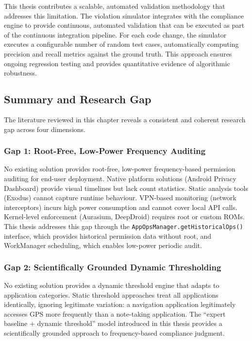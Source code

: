 This thesis contributes a scalable, automated validation methodology that addresses this limitation. The violation simulator integrates with the compliance engine to provide continuous, automated validation that can be executed as part of the continuous integration pipeline. For each code change, the simulator executes a configurable number of random test cases, automatically computing precision and recall metrics against the ground truth. This approach ensures ongoing regression testing and provides quantitative evidence of algorithmic robustness.

\subsection{Summary and Research Gap}
The literature reviewed in this chapter reveals a consistent and coherent research gap across four dimensions.

\subsubsection{Gap 1: Root-Free, Low-Power Frequency Auditing}
No existing solution provides root-free, low-power frequency-based permission auditing for end-user deployment. Native platform solutions (Android Privacy Dashboard) provide visual timelines but lack count statistics. Static analysis tools (Exodus) cannot capture runtime behaviour. VPN-based monitoring (network interceptors) incurs high power consumption and cannot cover local API calls. Kernel-level enforcement (Aurasium, DeepDroid) requires root or custom ROMs. This thesis addresses this gap through the \texttt{AppOpsManager.getHistoricalOps()} interface, which provides historical permission data without root, and WorkManager scheduling, which enables low-power periodic audit.

\subsubsection{Gap 2: Scientifically Grounded Dynamic Thresholding}
No existing solution provides a dynamic threshold engine that adapts to application categories. Static threshold approaches treat all applications identically, ignoring legitimate variation: a navigation application legitimately accesses GPS more frequently than a note-taking application. The ``expert baseline + dynamic threshold'' model introduced in this thesis provides a scientifically grounded approach to frequency-based compliance judgment.

